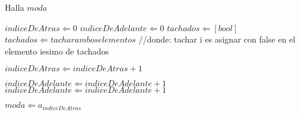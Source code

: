 \begin{algorithm}
\caption{Halla $moda$}
\begin{algorithmic}[1]
\STATE $indiceDeAtras \Leftarrow 0$
\STATE $indiceDeAdelante \Leftarrow 0$
\STATE $tachados \Leftarrow [bool]$
        \STATE $tachados \Leftarrow tachar ambos elementos$ //donde: tachar i es asignar con false en el elemento iesimo de tachados

            \STATE $indiceDeAtras \Leftarrow indiceDeAtras + 1$
        \ENDWHILE
    
            \STATE $indiceDeAdelante \Leftarrow indiceDeAdelante + 1$
        \ENDWHILE
    \ELSE
        \STATE $indiceDeAdelante \Leftarrow indiceDeAdelante + 1$
    \ENDIF

\ENDWHILE
\STATE $moda \Leftarrow a_{indiceDeAtras}$
\end{algorithmic}
\end{algorithm}